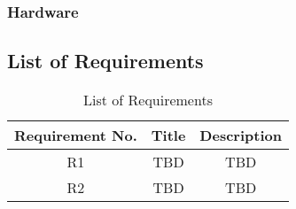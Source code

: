 \documentclass[11pt]{article}
\begin{document}
\subsubsection{Hardware}


\subsection{List of Requirements}
\begin{table}[h]
    \centering
    \caption{List of Requirements}
    \begin{tabular}{ccc}
        \toprule
        Requirement No. & Title & Description \\
        \midrule
        R1 & TBD & TBD \\
        R2 & TBD & TBD \\
        \bottomrule
    \end{tabular}
    \label{tab:docs_rev_hist}
\end{table}
\end{document}

